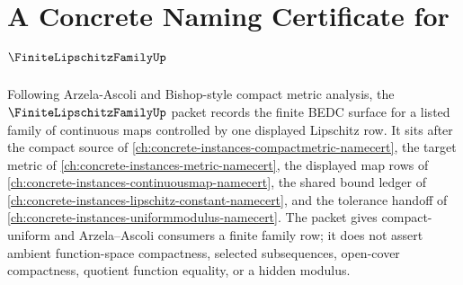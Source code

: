 \chapter{A Concrete Naming Certificate for $\FiniteLipschitzFamilyUp$}
\label{ch:concrete-instances-finite-lipschitz-family-namecert}

Following Arzela-Ascoli and Bishop-style compact metric analysis, the $\FiniteLipschitzFamilyUp$ packet records the finite BEDC surface for a listed family of continuous maps controlled by one displayed Lipschitz row. It sits after the compact source of \autoref{ch:concrete-instances-compactmetric-namecert}, the target metric of \autoref{ch:concrete-instances-metric-namecert}, the displayed map rows of \autoref{ch:concrete-instances-continuousmap-namecert}, the shared bound ledger of \autoref{ch:concrete-instances-lipschitz-constant-namecert}, and the tolerance handoff of \autoref{ch:concrete-instances-uniformmodulus-namecert}. The packet gives compact-uniform and Arzela--Ascoli consumers a finite family row; it does not assert ambient function-space compactness, selected subsequences, open-cover compactness, quotient function equality, or a hidden modulus.

